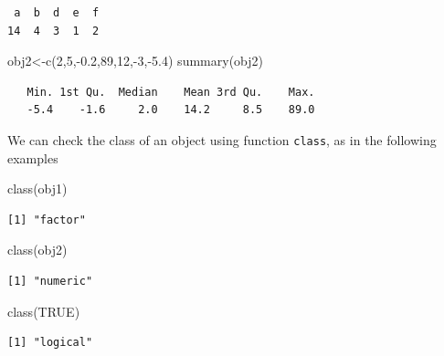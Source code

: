 \documentclass[
  letterpaper,
  DIV=11,
  numbers=noendperiod]{scrartcl}
\newenvironment{Shaded}{\begin{snugshade}}{\end{snugshade}}
\newcommand{\ConstantTok}[1]{\textcolor[rgb]{0.56,0.35,0.01}{#1}}
\newcommand{\DecValTok}[1]{\textcolor[rgb]{0.68,0.00,0.00}{#1}}
\newcommand{\FloatTok}[1]{\textcolor[rgb]{0.68,0.00,0.00}{#1}}
\newcommand{\FunctionTok}[1]{\textcolor[rgb]{0.28,0.35,0.67}{#1}}
\newcommand{\NormalTok}[1]{\textcolor[rgb]{0.00,0.23,0.31}{#1}}
\newcommand{\OtherTok}[1]{\textcolor[rgb]{0.00,0.23,0.31}{#1}}
\newcommand{\SpecialCharTok}[1]{\textcolor[rgb]{0.37,0.37,0.37}{#1}}
\begin{document}
\begin{verbatim}
 a  b  d  e  f 
14  4  3  1  2 
\end{verbatim}

\begin{Shaded}
\begin{Highlighting}[]
\NormalTok{obj2}\OtherTok{\textless{}{-}}\FunctionTok{c}\NormalTok{(}\DecValTok{2}\NormalTok{,}\DecValTok{5}\NormalTok{,}\SpecialCharTok{{-}}\FloatTok{0.2}\NormalTok{,}\DecValTok{89}\NormalTok{,}\DecValTok{12}\NormalTok{,}\SpecialCharTok{{-}}\DecValTok{3}\NormalTok{,}\SpecialCharTok{{-}}\FloatTok{5.4}\NormalTok{)}
\FunctionTok{summary}\NormalTok{(obj2)}
\end{Highlighting}
\end{Shaded}

\begin{verbatim}
   Min. 1st Qu.  Median    Mean 3rd Qu.    Max. 
   -5.4    -1.6     2.0    14.2     8.5    89.0 
\end{verbatim}

We can check the class of an object using function \texttt{class}, as in
the following examples

\begin{Shaded}
\begin{Highlighting}[]
\FunctionTok{class}\NormalTok{(obj1)}
\end{Highlighting}
\end{Shaded}

\begin{verbatim}
[1] "factor"
\end{verbatim}

\begin{Shaded}
\begin{Highlighting}[]
\FunctionTok{class}\NormalTok{(obj2)}
\end{Highlighting}
\end{Shaded}

\begin{verbatim}
[1] "numeric"
\end{verbatim}

\begin{Shaded}
\begin{Highlighting}[]
\FunctionTok{class}\NormalTok{(}\ConstantTok{TRUE}\NormalTok{)}
\end{Highlighting}
\end{Shaded}

\begin{verbatim}
[1] "logical"
\end{verbatim}
\end{document}
